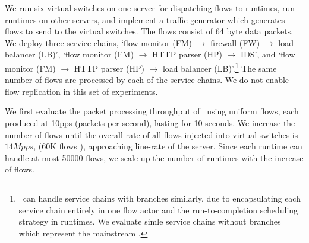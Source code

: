 

We run six virtual switches on one server for dispatching flows to runtimes, run runtimes on other servers, and implement a traffic generator which generates flows to send to the virtual switches. The flows consist of 64 byte data packets. We deploy three service chains, `flow monitor (FM) $\rightarrow$ firewall (FW) $\rightarrow$ load balancer (LB)', `flow monitor (FM) $\rightarrow$ HTTP parser (HP) $\rightarrow$ IDS', and `flow monitor (FM) $\rightarrow$ HTTP parser (HP) $\rightarrow$ load balancer (LB)'.\footnote{\nfactor~can handle service chains with branches similarly, due to encapsulating each service chain entirely in one flow actor and the run-to-completion scheduling strategy in runtimes. We evaluate simle service chains without branches which represent the mainstream \cite{hwang2015netvm, martins2014clickos}.} The same number of flows are processed by each of the service chains. We do not enable flow replication in this set of experiments. %


We first evaluate the packet processing throughput of \nfactor~using uniform flows, each produced at 10pps (packets per second), lasting for 10 seconds. We increase the number of flows until the overall rate of all flows injected into virtual switches is $14Mpps$, %
 (60K flows %
 ), approaching line-rate of the server. Since each runtime can handle at most 50000 flows, we scale up the number of runtimes with the increase of flows.


